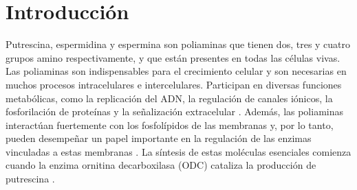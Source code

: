 



\section{Introducci\'on}

Putrescina, espermidina y espermina son poliaminas que tienen dos, tres y cuatro grupos amino respectivamente, y que est\'an presentes en todas las c\'elulas vivas.
Las poliaminas son indispensables para el crecimiento celular y son necesarias en muchos procesos intracelulares e intercelulares.
Participan en diversas funciones metab\'olicas, como la replicaci\'on del ADN, la regulaci\'on de canales i\'onicos, la fosforilaci\'on de prote\'inas y la se\~nalizaci\'on extracelular \cite{igarashi2010,Soda2011}.
Adem\'as, las poliaminas interact\'uan fuertemente con los fosfol\'ipidos de las membranas y, por lo tanto, pueden desempe\~nar un papel importante en la regulaci\'on de las enzimas vinculadas a estas membranas \cite{moinard2005}.
La s\'intesis de estas mol\'eculas esenciales comienza cuando la enzima ornitina decarboxilasa (ODC) cataliza la producci\'on de putrescina \cite{Soda2011,casero2009,pegg2010}.


